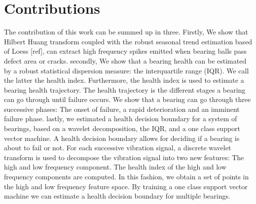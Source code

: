\documentclass[../Main/thesis.tex]{subfiles}
\begin{document}
\section{Contributions }
\label{sec:contributions}
The contribution of this work can be summed up in three. Firstly, We show that Hilbert Huang transform coupled with the robust seasonal trend estimation based of Loess [ref], can extract high frequency spikes emitted when bearing balls pass defect area or cracks.
\justify
secondly, We show that a bearing health can be estimated by a robust statistical dispersion measure: the interquartile range (IQR). We call the latter the health index. Furthermore,  the health index is used to estimate a bearing health trajectory. The health trajectory is the different stages a bearing can go through until failure occurs. We show that a bearing can go through three successive phases: The onset of failure, a rapid deterioration and an imminent failure phase. 
\justify
lastly, we estimated a health decision boundary for a system of bearings, based on a wavelet decomposition, the IQR, and a one class support vector machine. A health decision boundary allows for deciding if a bearing is about to fail or not. For each successive vibration signal, a discrete wavelet transform is used to decompose the vibration signal into two new features: The high and low frequency component. The health index of the high and low frequency components are computed. In this fashion, we obtain a set of points in the high and low frequency feature space. By training a one class support vector machine we can estimate a health decision boundary for multiple bearings.


\blankpage
\end{document}
